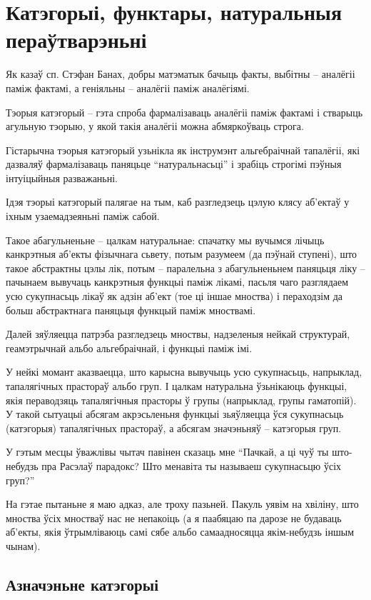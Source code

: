 \documentclass[a4paper,12pt]{book}
\begin{document}
\tableofcontents

\chapter{Катэгорыі, функтары, натуральныя пераўтварэньні}

Як казаў сп. Стэфан Банах, добры матэматык бачыць факты, выбітны --
аналёгіі паміж фактамі, а геніяльны -- аналёгіі паміж аналёгіямі.

Тэорыя катэгорый -- гэта спроба фармалізаваць аналёгіі паміж фактамі і
стварыць агульную тэорыю, у якой такія аналёгіі можна абмяркоўваць
строга.

Гістарычна тэорыя катэгорый узьнікла як інструмэнт альгебраічнай
тапалёгіі, які дазваляў фармалізаваць паняцьце ``натуральнасьці'' і
зрабіць строгімі пэўныя інтуіцыйныя разважаньні.

Ідэя тэорыі катэгорый палягае на тым, каб разгледзець цэлую клясу
аб'ектаў у іхным узаемадзеяньні паміж сабой.

Такое абагульненьне -- цалкам натуральнае: спачатку мы вучымся лічыць
канкрэтныя аб'екты фізычнага сьвету, потым разумеем (да пэўнай ступені), што такое
абстрактны цэлы лік, потым -- паралельна з абагульненьнем паняцьця
ліку -- пачынаем вывучаць канкрэтныя функцыі паміж лікамі, пасьля чаго
разглядаем усю сукупнасьць лікаў як адзін аб'ект (тое ці іншае
мноства) і пераходзім да больш абстрактнага паняцьця функцый паміж
мноствамі.

Далей зяўляецца патрэба разгледзець мноствы, надзеленыя нейкай
структурай, геамэтрычнай альбо альгебраічнай, і функцыі паміж імі.

У нейкі момант аказваецца, што карысна вывучыць усю сукупнасьць,
напрыклад, тапалягічных прастораў альбо груп. І цалкам натуральна
ўзьнікаюць функцыі, якія пераводзяць тапалягічныя прасторы ў групы
(напрыклад, групы гаматопій). У такой сытуацыі абсягам акрэсьленьня
функцыі зьяўляецца ўся сукупнасьць (катэгорыя) тапалягічных прастораў,
а абсягам значэньняў -- катэгорыя груп.

У гэтым месцы ўважлівы чытач павінен сказаць мне ``Пачкай, а ці чуў ты
што-небудзь пра Расэлаў парадокс? Што менавіта ты называеш сукупнасьцю
ўсіх груп?''

На гэтае пытаньне я маю адказ, але троху пазьней. Пакуль уявім на
хвіліну, што мноства ўсіх мностваў нас не непакоіць (а я паабяцаю па
дарозе не будаваць аб'екты, якія ўтрымліваюць самі сябе альбо
самаадносяцца якім-небудзь іншым чынам).

\section{Азначэньне катэгорыі}
\end{document}
